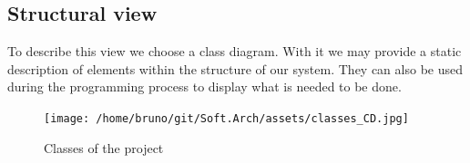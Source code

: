 \newpage
\subsection{Structural view}
To describe this view we choose a \gls{class diagram}. With it we may provide a static description of elements
within the structure of our system. They can also be used during the programming process to display what is needed
to be done.

\begin{figure}[H]
    \centering
    \texttt{[image: /home/bruno/git/Soft.Arch/assets/classes\_CD.jpg]}
    \caption{Classes of the project}
    \label{fig:class_CD}
\end{figure}
 



